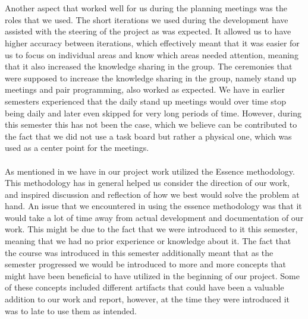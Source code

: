 \\\\
Another aspect that worked well for us during the planning meetings was the roles that we used. 
The short iterations we used during the development have assisted with the steering of the project as was expected. It allowed us to have higher accuracy between iterations, which effectively meant that it was easier for us to focus on individual areas and know which areas needed attention, meaning that it also increased the knowledge sharing in the group. The  ceremonies that were supposed to increase the knowledge sharing in the group, namely stand up meetings and pair programming, also worked as expected. We have in earlier semesters experienced that the daily stand up meetings would over time stop being daily and later even skipped for very long periods of time. However, during this semester this has not been the case, which we believe can be contributed to the fact that we did not use a task board but rather a physical one, which was used as a center point for the meetings. 
\\\\
As mentioned in  we have in our project work utilized the Essence methodology. This methodology has in general helped us consider the direction of our work, and inspired discussion and reflection of how we best would solve the problem at hand. An issue that we encountered in using the essence methodology was that it would take a lot of time away from actual development and documentation of our work. This might be due to the fact that we were introduced to it this semester, meaning that we had no prior experience or knowledge about it. The fact that the course was introduced in this semester additionally meant that as the semester progressed we would be introduced to more and more concepts that might have been beneficial to have utilized in the beginning of our project. Some of these concepts included different artifacts that could have been a valuable addition to our work and report, however, at the time they were introduced it was to late to use them as intended.


